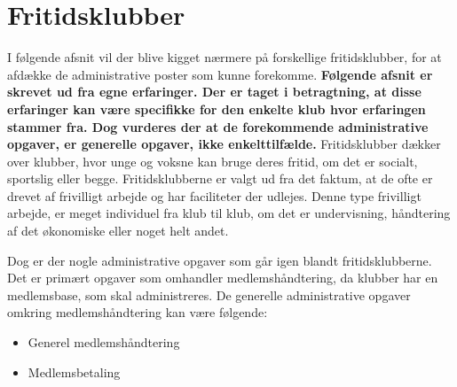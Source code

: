 \chapter{Fritidsklubber} \label{chap:Fritidsklubber}

I følgende afsnit vil der blive kigget nærmere på forskellige fritidsklubber, for at afdække de administrative
poster som kunne forekomme. \textbf{Følgende afsnit er skrevet ud fra egne erfaringer. Der er taget i betragtning, at disse erfaringer kan være specifikke for den enkelte klub hvor erfaringen stammer fra. Dog vurderes der at de forekommende administrative opgaver, er generelle opgaver, ikke enkelttilfælde.}
Fritidsklubber dækker over klubber, hvor unge og voksne kan bruge deres fritid, om
det er socialt, sportslig eller begge. Fritidsklubberne er valgt ud fra det faktum, at de ofte er drevet af frivilligt
arbejde og har faciliteter der udlejes. Denne type frivilligt arbejde, er meget individuel fra klub til klub, om det er undervisning, håndtering af det
økonomiske eller noget helt andet.

Dog er der nogle administrative opgaver som går igen blandt fritidsklubberne. Det er primært opgaver som omhandler medlemshåndtering, da klubber har en medlemsbase, som skal administreres. De generelle administrative opgaver omkring medlemshåndtering kan være følgende:
\begin{itemize}
	\item Generel medlemshåndtering
	\item Medlemsbetaling
\end{itemize}





